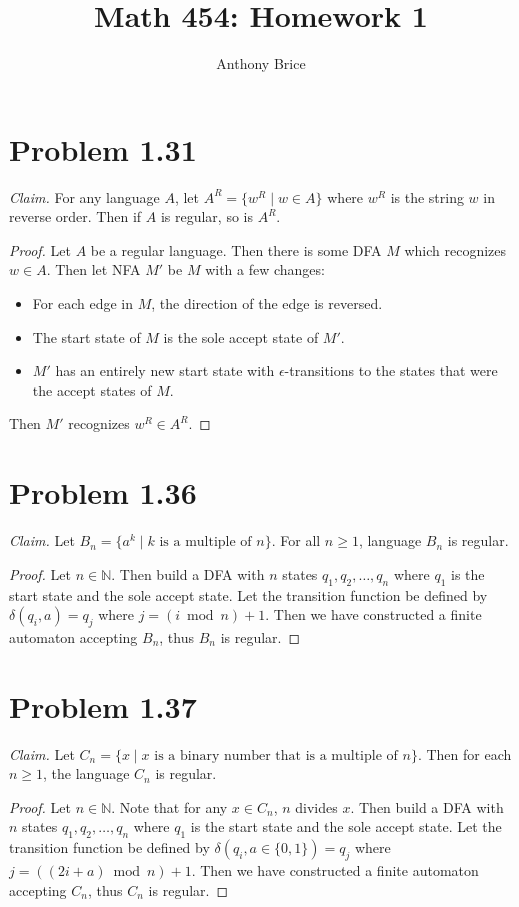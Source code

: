 \documentclass{abrice}
\author{Anthony Brice}
\title{Math 454: Homework 1}
\newcommand{\N}{\mathbb{N}}
\begin{document}
\maketitle

\section{Problem 1.31}
\textit{Claim.} For any language $A$, let $A^R = \{ w^R \mid w \in A \}$ where
$w^R$ is the string $w$ in reverse order. Then if
$A$ is regular, so is $A^R$.

\begin{proof}
  Let $A$ be a regular language. Then there is some DFA $M$ which recognizes $w
  \in A$. Then let NFA $M'$ be $M$ with a few changes:
  \begin{itemize}
  \item For each edge in $M$, the direction of the edge is reversed.
  \item The start state of $M$ is the sole accept state of $M'$.
  \item $M'$ has an entirely new start state with $\epsilon$-transitions to the
    states that were the accept states of $M$.
  \end{itemize}
  Then $M'$ recognizes $w^R \in A^R$.
\end{proof}

\section{Problem 1.36}
\textit{Claim.} Let $B_n = \{ a^k \mid k \text{ is a multiple of } n \}$. For
all $n \geq 1$, language $B_n$ is regular.

\begin{proof}
  Let $n \in \N$. Then build a DFA with $n$ states $q_1, q_2, \ldots, q_n$ where
  $q_1$ is the start state and the sole accept state. Let the transition
  function be defined by $\delta(q_i, a) = q_j$ where $j = (i \bmod n) + 1$.
  Then we have constructed a finite automaton accepting $B_n$, thus $B_n$ is
  regular.
\end{proof}

\section{Problem 1.37}
\textit{Claim.} Let $C_n = \{x \mid x \text{ is a binary number that is a
  multiple of } n \}$. Then for each $n \geq 1$, the language $C_n$ is regular.

\begin{proof}
  Let $n \in \N$. Note that for any $x \in C_n$, $n$ divides $x$. Then build a
  DFA with $n$ states $q_1, q_2, \ldots, q_n$ where $q_1$ is the start state and
  the sole accept state. Let the transition function be defined by $\delta(q_i,
  a \in \{0,1\}) = q_j$ where $j = ((2i + a) \bmod n) + 1$. Then we have
  constructed a finite automaton accepting $C_n$, thus $C_n$ is regular.
\end{proof}
\end{document}
